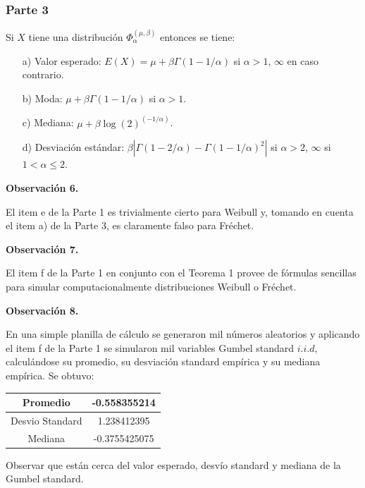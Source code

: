 \documentclass[
  oneside]{book}
\begin{document}
\hypertarget{parte-3}{%
\subsubsection{Parte 3}\label{parte-3}}

Si \(X\) tiene una distribución \(\Phi_{\alpha}^{(\mu, \beta)}\)
entonces se tiene:

\begin{itemize}
  \item[a)] Valor esperado: $E(X) = \mu + \beta\Gamma(1-1/\alpha)$ si $\alpha > 1$, $\infty$ en caso contrario.
  \item[b)] Moda: $\mu + \beta\Gamma(1-1/\alpha)$ si $\alpha>1$.
  \item[c)] Mediana: $\mu + \beta \log(2)^{(-1/\alpha)}$.
  \item[d)] Desviación estándar: $\beta|\Gamma(1-2/\alpha)-\Gamma(1-1/\alpha)^2|$ si $\alpha>2$, $\infty$ si $1<\alpha \leq 2$.
\end{itemize}

\textbf{Observación 6.}

El item e de la Parte 1 es trivialmente cierto para Weibull y, tomando
en cuenta el item a) de la Parte 3, es claramente falso para Fréchet.

\textbf{Observación 7.}

El item f de la Parte 1 en conjunto con el Teorema 1 provee de fórmulas
sencillas para simular computacionalmente distribuciones Weibull o
Fréchet.

\textbf{Observación 8.}

En una simple planilla de cálculo se generaron mil números aleatorios y
aplicando el item f de la Parte 1 se simularon mil variables Gumbel
standard \(i.i.d\), calculándose su promedio, su desviación standard
empírica y su mediana empírica. Se obtuvo:

\begin{table}[h]
\centering
\begin{tabular}{|c|c|}
\hline
Promedio & -0.558355214 \\ \hline
Desvio Standard & 1.238412395 \\ \hline
Mediana & -0.3755425075 \\ \hline
\end{tabular}
\end{table}

Observar que están cerca del valor esperado, desvío standard y mediana
de la Gumbel standard.

\newpage
\end{document}
